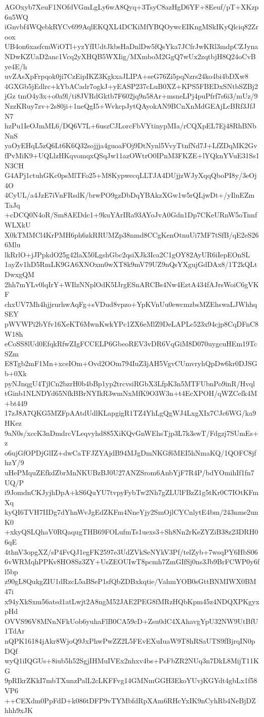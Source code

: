 AGOxyb7XeuF1NOfdVGmLgLy6wA8Qyq+3TsyC8azHgD6YF+8Eeuf/pT+XKzp6u5WQ
iGnvbf4WQebkRYCv699AqlEKQXL4DCKiMfYBQOywcEIKngMSkIKyQlciq82Zroox
UB4on6xasfcmWiOTl+yzYfIUdtJkbsHaDnlDw5fQsYka7JCfrJwKRl3mdpCZJyna
NDwKZUaD2anc1Vcq2yXHQB5WXIig/MXmboM2GgQ7wUx2zqtbjH8Q24oCvBye4E/h
uvZAsXpFrpqok0ji7CzEipIKZ3KgkxaJLIPA+seG76Zi5pqNzrs24ko4bi4bDXw8
4GXGb5jEdlrc+kYbACadr7ogkJ+yEASP237cLuB0XZ+KPS5FBEDxSNtbSZBj2jGz
tmO4y3x+o0a9l/ti8JVRdGktb7F602jq9n58Ar+msneLPj4puPfrf7s6i3/mUz/9
NzzKRuy7zv+2s80ji+1neQgI5+WvkcpJytQAyokAN9BCnXnMdGEAjLcBRf3JfJN7
hzPu1IeOJmML6/DQ6V7L+6uszCJLorcFbVYtinypMIa/rCQXpEL7Ej48RhBNbNnS
yaOyEHqL5zQ6Lt6K6Q32sojjja4guoaFOj9DtNynl5VvyTtnfNd7J+LfZDqMK2Gv
fPvMiK9+UQLlzHKqvomqxQSqJw11azOWtrO0IPnM3FKZE+lYQknYVuE31Ss1N3CH
G4APj1ctuhGKc0psMlTFo25+M8KypwecqLLTJA4DUjjzWJyXqqQboPI8y/3eOj4O
4CyUL/a4JzE7iVnFRsdK/brwPO9gzDbDqYBAkzXGw1w5rQLjwDt+/yIlnEZmTaJq
+cDCQ0N4oR/Sm8AEDdc1+9kuYArIRa93AYoJvA0Gdn1Dp7CKeURnW5oTnnfWLXkU
X0kTMMCl4KrPMH6ph6zkRRUMZp38nmd8CCgKenOtnuUi7MF7tSfB/qE2eS266Mlu
lkRrlO+jJPpkdO25g42laX50LgshGbc2qsiXJk3Ica2C1gOY82AyUR6iIepEOnSL
1ayZv1hD5RmLK9GA6XNOxm0wXT8k9mV79UZ9nQsYXgujGdDAx8/1T2kQLtDwxgQM
2hh7mYLv0lqIrY+WIlzNNplOdK5IJrgESnARCBs4Nw4EztA434fAJrsWoiC6gVKF
chxUV7Mh4hjjrurhwAqFg+sVDud8vpzo+YpKVnUu0ewcmzbsMZEhswaLJWhhqSEY
pWVWPi2bYfv16XeKT6MwnKwkYPc1ZX6eMlZ9DeLAPLc523x94cjp8CqDFnC8W18h
eCoSS8lUd0EfqkRfwZIgFCCELP6GbeoREV3vDR6VqGiM8D070uygcuHEm19TcSZm
E8Tgb2mF1Mn+xceIOm+Ovd2OOm794IuZ3jAH5VgvCUmvryhQpDw6kr0DJSGb+0Xk
pyNJnqgU4TjlCn2bzrH0b4bBp1yp2trcvsiRGbX3LfpK3n5MTFUbnPo9inR/Hvql
tGinb1NLNDYd65NfkBBrNYIkR3wmNxMfK9O3W3n+t4EcXPOH/qWZCefk4M+bt449
17zJ8A7QKG5MZFpAAtdUdlKLapgigR1TZ4YhLgQgWJ4LxgXIx7CJc6WG/ka9HKez
9aN0s/xccK3nDmdrcVLeqvyhd885XiKQvGnWEhsTjp3L7k3swT/Fdgzj7SUmEs+z
o6ujGfOPDjGlIZ+dwCaTFJZYAjdB94MJgDmNKGf6MEI5hNmaKQ/1QOFC8jfhzY/9
uHePMquZEfkdZbrMnNKUBzBJ0U27ANZSrom6AnbYjF7R4P/bdYOmihIf1fn7UQ/P
i9JomdnCKJyjhDpA+kS6QuYU7tvpyFybTw2Nh7gZLUlFBzZ1g5tKr0C7IOtKFmXq
kyQI6TVH7IIDg7dYhnWvJgEdZKFm4NneYjy2SmOjlCYCnlytE4bm/243nme2unK0
+xkyQSLQhaV0RQaqugTHB69FOLufmTs1uexs3+Sh8Nn2rKeZYZiB38z23DRH06qE
4thnV3opgXZ/sP4FvQJ1egFK2597e3UdZVkSeNYkV3Pf/telZyb+7wsqPY6HbS06
6vWRMqhPPKv8HO8Sz3ZY+UsZEOUIwT8pcmh7ZmGIfSj0ns3Jb9BrFCWP0y6fl5bp
z90gL8QukgZIU1dRzcL5aBSeP1sfQbZDBxkqtie/VahmYOB0sGttBNMIWX0BM47i
x94yXkSxm56atsd1atLwjt2A8ngM52JAE2PEG8fMRzHQbKpm45z4NDQXPKgyxpHd
OVVS96V8MNnNFkUob6yuhaFlB0CA59cD+Zsu0dC4XAhavgYpU32NW9UtBfU1TdAr
nQPK16184jAkr8WjoQ9JxPhwPwZZ2L5FEvEXuIuaW9T8hRSaUTS9fBjrqIN0pDQf
wyQ1iIQGUs+8iub5h52SgjIHMuIVEx2nhxv4bs+PsFbZR2NUq3n7DkL8MijT11KG
9pRIkrZKkI7mbTXunzPalL2cLKFFvg14GMNmGGH3EkoYUvjKGYdt4gbLx1f58VP6
++CEXdm0PpFdD+k086tDFP9vTYMbfdRpXAm6RHcYxIK9nCyhRb4NeBjDZhhh9xJK
